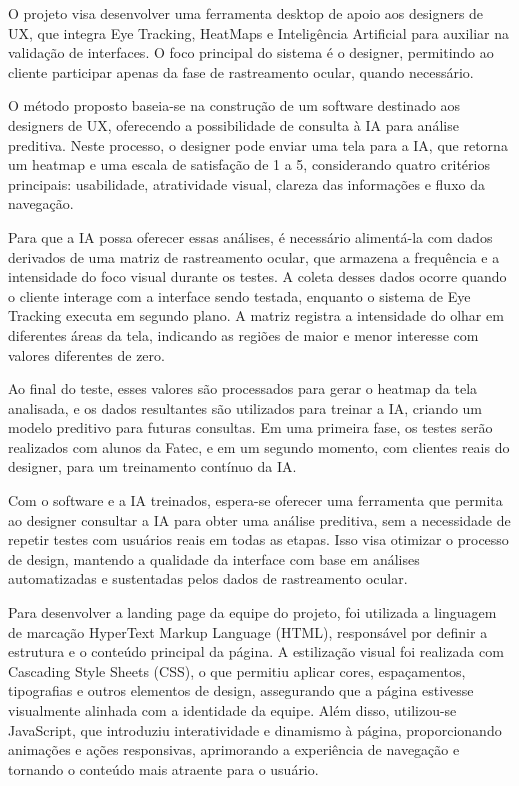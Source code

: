 O projeto visa desenvolver uma ferramenta desktop de apoio aos designers de UX, que integra Eye Tracking, HeatMaps e Inteligência Artificial para auxiliar na validação de interfaces. O foco principal do sistema é o designer, permitindo ao cliente participar apenas da fase de rastreamento ocular, quando necessário.

O método proposto baseia-se na construção de um software destinado aos designers de UX, oferecendo a possibilidade de consulta à IA para análise preditiva. Neste processo, o designer pode enviar uma tela para a IA, que retorna um heatmap e uma escala de satisfação de 1 a 5, considerando quatro critérios principais: usabilidade, atratividade visual, clareza das informações e fluxo da navegação.

Para que a IA possa oferecer essas análises, é necessário alimentá-la com dados derivados de uma matriz de rastreamento ocular, que armazena a frequência e a intensidade do foco visual durante os testes. A coleta desses dados ocorre quando o cliente interage com a interface sendo testada, enquanto o sistema de Eye Tracking executa em segundo plano. A matriz registra a intensidade do olhar em diferentes áreas da tela, indicando as regiões de maior e menor interesse com valores diferentes de zero.

Ao final do teste, esses valores são processados para gerar o heatmap da tela analisada, e os dados resultantes são utilizados para treinar a IA, criando um modelo preditivo para futuras consultas. Em uma primeira fase, os testes serão realizados com alunos da Fatec, e em um segundo momento, com clientes reais do designer, para um treinamento contínuo da IA.

Com o software e a IA treinados, espera-se oferecer uma ferramenta que permita ao designer consultar a IA para obter uma análise preditiva, sem a necessidade de repetir testes com usuários reais em todas as etapas. Isso visa otimizar o processo de design, mantendo a qualidade da interface com base em análises automatizadas e sustentadas pelos dados de rastreamento ocular.

Para desenvolver a landing page da equipe do projeto, foi utilizada a linguagem de marcação HyperText Markup Language (HTML), responsável por definir a estrutura e o conteúdo principal da página. A estilização visual foi realizada com Cascading Style Sheets (CSS), o que permitiu aplicar cores, espaçamentos, tipografias e outros elementos de design, assegurando que a página estivesse visualmente alinhada com a identidade da equipe. Além disso, utilizou-se JavaScript, que introduziu interatividade e dinamismo à página, proporcionando animações e ações responsivas, aprimorando a experiência de navegação e tornando o conteúdo mais atraente para o usuário.

